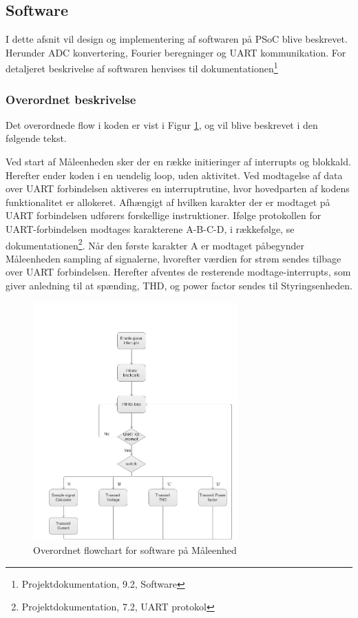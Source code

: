 
\subsection{Software}
I dette afsnit vil design og implementering af softwaren på PSoC blive beskrevet. Herunder ADC konvertering, Fourier beregninger og  UART kommunikation. For detaljeret beskrivelse af softwaren henvises til dokumentationen\footnote{Projektdokumentation, 9.2, Software}

\subsubsection{Overordnet beskrivelse}
Det overordnede flow i koden er vist i Figur \ref{fig:MEflowchart}, og vil blive beskrevet i den følgende tekst.  

Ved start af Måleenheden sker der en række initieringer af interrupts og blokkald. Herefter ender koden i en uendelig loop, uden aktivitet. Ved modtagelse af data over UART forbindelsen aktiveres en interruptrutine, hvor hovedparten af kodens funktionalitet er allokeret. 
Afhængigt af hvilken karakter der er modtaget på UART forbindelsen udførers forskellige instruktioner. Ifølge protokollen for UART-forbindelsen modtages karakterene A-B-C-D, i rækkefølge, se dokumentationen\footnote{Projektdokumentation, 7.2, UART protokol}.
Når den første karakter A er modtaget påbegynder Måleenheden sampling af signalerne, hvorefter værdien for strøm sendes tilbage over UART forbindelsen. Herefter afventes de resterende modtage-interrupts, som giver anledning til at spænding, THD, og power factor sendes til Styringsenheden. 
\begin{figure}[H] %
	\centering
	\includegraphics[width=0.7\textwidth]{Figure/MEflowchart.png}
	\caption{Overordnet flowchart for software på Måleenhed}
	\label{fig:MEflowchart}
\end{figure}




